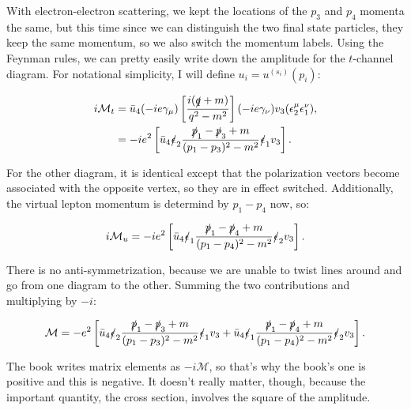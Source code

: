 With electron-electron scattering, we kept the locations of the $p_3$ and $p_4$ momenta the same, but this time since we can distinguish the two final state particles, they keep the same momentum, so we also switch the momentum labels. Using the Feynman rules, we can pretty easily write down the amplitude for the $t$-channel diagram. For notational simplicity, I will define $u_i = u^{(s_i)}(p_i)$:

\begin{align*}
    i\mathcal{M}_t &= \bar{u}_4 (-ie\gamma_{\mu}) \left[ \frac{i(\slashed{q} + m)}{q^2 - m^2} \right] (-ie\gamma_{\nu})v_3 (\epsilon^{\mu}_2\epsilon^{\nu}_1), \\
    &= -ie^2 \left[ \bar{u}_4 \slashed{\epsilon}_2 \frac{\slashed{p}_1 - \slashed{p}_3 + m}{(p_1 - p_3)^2 - m^2} \slashed{\epsilon}_1 v_3 \right].
\end{align*}

For the other diagram, it is identical except that the polarization vectors become associated with the opposite vertex, so they are in effect switched. Additionally, the virtual lepton momentum is determind by $p_1 - p_4$ now, so:

\begin{equation*}
    i\mathcal{M}_u = -ie^2 \left[ \bar{u}_4 \slashed{\epsilon}_1 \frac{\slashed{p}_1 - \slashed{p}_4 + m}{(p_1 - p_4)^2 - m^2} \slashed{\epsilon}_2 v_3 \right].
\end{equation*}

There is no anti-symmetrization, because we are unable to twist lines around and go from one diagram to the other. Summing the two contributions and multiplying by $-i$:

\begin{equation}
    \mathcal{M} = -e^2 \left[ \bar{u}_4 \slashed{\epsilon}_2 \frac{\slashed{p}_1 - \slashed{p}_3 + m}{(p_1 - p_3)^2 - m^2} \slashed{\epsilon}_1 v_3 + \bar{u}_4 \slashed{\epsilon}_1 \frac{\slashed{p}_1 - \slashed{p}_4 + m}{(p_1 - p_4)^2 - m^2} \slashed{\epsilon}_2 v_3 \right].
\end{equation}

The book writes matrix elements as $-i\mathcal{M}$, so that's why the book's one is positive and this is negative. It doesn't really matter, though, because the important quantity, the cross section, involves the square of the amplitude.